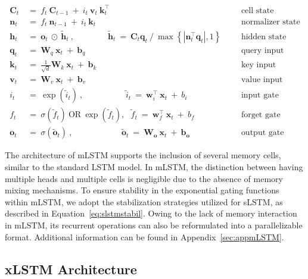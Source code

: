 \begin{align}
\label{eq:mlstm_recurrent_begin}
\mathbf{C}_t \ &= \  f_t \ \mathbf{C}_{t-1} \ + \ 
  i_t \ \mathbf{v}_t \ \mathbf{k}_t^\top & &  &\text{cell state} \\
\mathbf{n}_t \ &= \  f_t \ \mathbf{n}_{t-1} \ + \ 
  i_t \ \mathbf{k}_t & &  &\text{normalizer state} \\
\mathbf{h}_t  \ &= \ \mathbf{o}_t \ \odot \ \tilde{\mathbf{h}}_t
\ , \qquad \qquad 
\tilde{\mathbf{h}}_t \ = \   \mathbf{C}_t \mathbf{q}_t \ / \ 
  \max \left\{ |\mathbf{n}_t^\top \mathbf{q}_t|, 1 \right\} 
   &&&\text{hidden state} \\
\mathbf{q}_t \ &= \ \mathbf{W}_q \ \mathbf{x}_t \ + \ \mathbf{b}_q  & &  &\text{query input} \\
\mathbf{k}_t \ &= \ \frac{1}{\sqrt{d}} \mathbf{W}_k \ \mathbf{x}_t \ + \ \mathbf{b}_k  & &  &\text{key input} \\
\mathbf{v}_t \ &= \ \mathbf{W}_v \ \mathbf{x}_t \ + \ \mathbf{b}_v  & &  &\text{value input} \\
i_t \ &= \ \!\exp \!  \! \left( \tilde{i}_t  \right) \ , 
 \qquad \qquad \ \ \ \ \,
  \tilde{i}_t \ = \ \mathbf{w}^\top_{i} \ \mathbf{x}_t \ + \  b_{i} \ \ \ 
  &&&\text{input gate} \\
f_t \ &= \ \sigma \!  \left(  \tilde{f}_t \right) \ \text{OR} \ \!\exp \!  \! \left(  \tilde{f}_t \right) , \ \ \: \!
\tilde{f}_t \ = \ \mathbf{w}^\top_{f} \ \mathbf{x}_t  \ + \
  b_{f}
  &&& \text{forget gate} \\
\label{eq:mlstm_recurrent_end}
\mathbf{o}_t \ &= \ \sigma \left( \tilde{\mathbf{o}}_t \right) \ , \qquad \qquad \quad \ \ \ \,
  \tilde{\mathbf{o}}_t  \ = \ \mathbf{W}_{\mathbf{o}} \ \mathbf{x}_t \ + \
  \mathbf{b}_{\mathbf{o}}
  &&&\text{output gate} 
\end{align}

The architecture of mLSTM supports the inclusion of several memory cells, similar to the standard LSTM model. In mLSTM, the distinction between having multiple heads and multiple cells is negligible due to the absence of memory mixing mechanisms. To ensure stability in the exponential gating functions within mLSTM, we adopt the stabilization strategies utilized for sLSTM, as described in Equation~\ref{eq:slstmstabil}. Owing to the lack of memory interaction in mLSTM, its recurrent operations can also be reformulated into a parallelizable format. Additional information can be found in Appendix~\ref{sec:appmLSTM}.

\subsection{xLSTM Architecture}
\label{sec:xLSTMarch}

